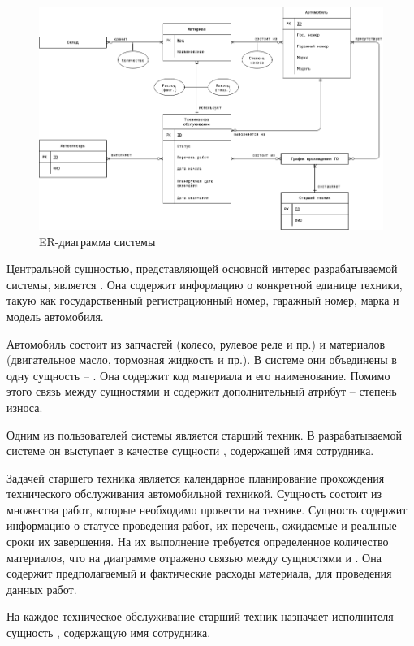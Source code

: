 \documentclass[../nirs.tex]{subfiles}
\begin{document}
\begin{figure}
	\centering
	\includegraphics[keepaspectratio,
                     width=\textwidth,
                     height=0.6\textheight]{./images/er-diagram.drawio.png}
	\caption{ER-диаграмма системы}
	\label{fig:2_1_er_diagram}
\end{figure}

\pagebreak

Центральной сущностью, представляющей основной интерес разрабатываемой системы,
является . Она содержит информацию о конкретной единице
техники, такую как государственный регистрационный номер, гаражный номер, марка
и модель автомобиля.

Автомобиль состоит из запчастей (колесо, рулевое реле и пр.) и материалов
(двигательное масло, тормозная жидкость и пр.). В системе они объединены в одну
сущность -- . Она содержит код материала и его наименование.
Помимо этого связь между сущностями  и
 содержит дополнительный атрибут -- степень износа.

Одним из пользователей системы является старший техник. В разрабатываемой
системе он выступает в качестве сущности , содержащей
имя сотрудника.

Задачей старшего техника является календарное планирование прохождения
технического обслуживания автомобильной техникой. Сущность  состоит из множества работ, которые необходимо провести на
технике. Сущность  содержит информацию о
статусе проведения работ, их перечень, ожидаемые и реальные сроки их завершения.
На их выполнение требуется определенное количество материалов, что на диаграмме
отражено связью между сущностями  и
. Она содержит предполагаемый и фактические расходы
материала, для проведения данных работ.

На каждое техническое обслуживание старший техник назначает исполнителя --
сущность , содержащую имя сотрудника.
\end{document}
